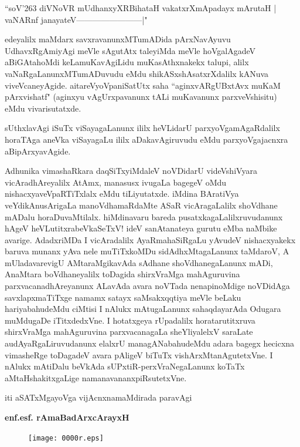 \begin{shloka}
``soV\char'263 diVNoVR mUdhanxyXRBihataH vakatxrXmApadayx mArutaH |\\
vaNARnf janayateV------------------------|"
\end{shloka}

edeyalilx maMdarx savxravanunxMTumADida pArxNavAyuvu UdhavxRgAmiyAgi meVle sAgutAtx tale\-yiMda meVle hoVgalAgadeV aBiGAtahoMdi keLamuKa\-vAgiLidu muKasAthxnakekx talupi, alilx vaNaR\-gaLa\-nunxMTu\-mADuvudu eMdu shikASx\-shAsatxrXdalilx kANuva viveVcaneyAgide. aitareVyoVpaniSatUtx saha ``aginxvARgUBxtAvx muKaM pArxvishatf" (aginxyu vAgUrxpavanunx tALi muKavanunx parxveVshisitu) eMdu vivarisutatxde.

sUthxlavAgi iSuTx viSayagaLanunx ililx heVLidarU parxyoVgamAgaRdalilx horaTAga aneVka viSaya\-gaLu ililx aDakavAgiruvudu eMdu parxyoVgajacnxra aBipArxyavAgide.

Adhunika vimashaRkara daqSiTxyiMdaleV noVDidarU videVshiVyara vicAra\-dhAreyalilx AtAmx, manasusx\- ivu\-gaLa bagegeV oMdu nishacxyaveVpaRTiTxlalx eMdu tiLiyutatxde. iMdina BAratiVya veYdikAnu\-sAri\-gaLa manoVdhamaRdaMte ASaR vicAragaLalilx shoVdhane mADalu horaDuvaMtilalx. hiMdinavaru bareda pusatxkagaLalilxruvudanunx hAgeV heVLutitxrabeVkaSeTxV! ideV sanAtanateya gurutu eMba naMbike avarige. AdadxriMDa I vicAradalilx AyaRmahaSiRgaLu yAvudeV nishacxyakekx baruva munanx yAva nele muTiTx\-koMDu sidAdhxMtagaLanunx taMdaroV, A mUladavarevigU AMtaraMgikavAda sAdhane shoVdhanegaLanunx mADi, AnaMtara boVdhaneyalilx toDagida shirxVraMga mahAguruvina parxvacanadhAreyanunx ALavAda avara noVTada nenapinoMdige noVDidAga savxlapxmaTiTxge namamx satayx saMsakxqqtiya meVle beLaku hariyabahudeMdu ciMtisi I nAlukx mAtugaLanunx sahaqdayarAda Odugara muMdugaDe iTitxdedxVne. I hotatx\-geya rUpa\-dalilx horatarutitxruva shirxVraMga mahAguruvina parxvacanagaLa sheYliyalelxV saraLate audAyaR\-gaLiruvu\-danunx elalxrU managANabahudeMdu adara bagegx hecicxna vimasheRge toDagadeV avara pAligeV biTuTx vishArxMta\-nAgutetxVne. I nAlukx mAtiDalu beVkAda sUPxtiR-perxVraNegaLanunx koTaTx aMtaHshakitxgaLige namana\-vananxpiRsu\-tetxVne.

\bigskip

\hfill iti aSATxMgayoVga vijAcnxnamaMdirada paravAgi

\smallskip

\hfill {\bf enf.esf. rAmaBadArxcArayxH}

\newpage

\thispagestyle{empty}
\begin{figure}[h]
\centering
{\texttt{[image: 0000r.eps]}}
\end{figure}
